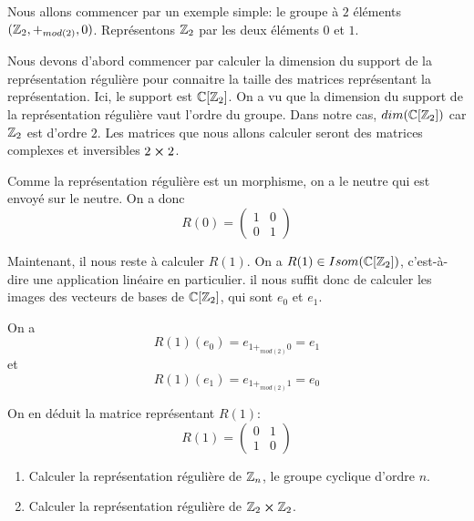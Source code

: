 \begin{exemple}
	Nous allons commencer par un exemple simple: le groupe à $2$ éléments
	$(\mathbb{Z}_{2}, +_{mod(2)}, 0)$. Représentons $\mathbb{Z}_{2}$ par les deux
	éléments $0$ et $1$.

	Nous devons d'abord commencer par calculer la dimension du support de la représentation
	régulière pour connaitre la taille des matrices représentant la
	représentation. Ici, le support est $\mathbb{C}[\mathbb{Z}_{2}]$. On a vu que la
	dimension du support de la représentation régulière vaut l'ordre du groupe.
	Dans notre cas, $dim(\mathbb{C}[\mathbb{Z}_{2}])$ car $\mathbb{Z}_{2}$ est d'ordre
	$2$.
	Les matrices que nous allons calculer seront des matrices complexes et
	inversibles $2 \cross 2$.

	Comme la représentation régulière est un morphisme, on a le neutre qui est
	envoyé sur le neutre. On a donc
	\begin{equation}
		R(0) =
		\begin{pmatrix}
			1 & 0 \\
			0 & 1
		\end{pmatrix}
	\end{equation}

	Maintenant, il nous reste à calculer $R(1)$. On a $R(1) \in
	Isom(\mathbb{C}[\mathbb{Z}_{2}])$, c'est-à-dire une application linéaire en
	particulier. il
	nous suffit donc de calculer les images des vecteurs de bases de
	$\mathbb{C}[\mathbb{Z}_{2}]$, qui sont $e_{0}$ et $e_{1}$.

	On a
	\begin{equation}
		R(1) (e_{0}) = e_{1 +_{mod(2)} 0} = e_{1}
	\end{equation}
	et
	\begin{equation}
		R(1) (e_{1}) = e_{1 +_{mod(2)} 1} = e_{0}
	\end{equation}

	On en déduit la matrice représentant $R(1)$:
	\begin{equation}
		R(1) =
		\begin{pmatrix}
			0 & 1 \\
			1 & 0
		\end{pmatrix}
	\end{equation}


\end{exemple}

\begin{exercice}
	\begin{enumerate}
		\item Calculer la représentation régulière de $\mathbb{Z}_{n}$, le groupe
			cyclique d'ordre $n$.
		\item Calculer la représentation régulière de $\mathbb{Z}_{2} \cross
			\mathbb{Z}_{2}$.
	\end{enumerate}
\end{exercice}

